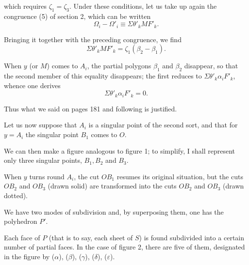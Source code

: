 \documentclass{article}
\begin{document}
which requires $\zeta_{1} = \zeta_{3}$. Under these conditions, let us take up again the congruence (5) of section 2, which can be written
\[ \Omega_{i} - \Omega'_{i} \equiv \Sigma \theta'_{k} MF'_{k}. \]

Bringing it together with the preceding congruence, we find
\[ \Sigma \theta'_{k} MF'_{k} = \zeta_{1}(\beta_{2} - \beta_{1}). \]

When $y$ (or $M$) comes to $A_{i}$, the partial polygons $\beta_{1}$ and $\beta_{2}$ disappear, so that the second member of this equality disappears; the first reduces to $\Sigma \theta'_{k} \alpha_{i}F'_{k}$, whence one derives
\[ \Sigma \theta'_{k} \alpha_{i}F'_{k} = 0. \]

Thus what we said on pages 181 and following is justified.

Let us now suppose that $A_{i}$ is a singular point of the second sort, and that for $y = A_{i}$ the singular point $B_{1}$ comes to $O$.

We can then make a figure analogous to figure 1; to simplify, I shall represent only three singular points, $B_{1}, B_{2}$ and $B_{3}$.

When $y$ turns round $A_{i}$, the cut $OB_{1}$ resumes its original
situation, but the cuts $OB_{2}$ and $OB_{3}$ (drawn solid) are transformed into the cuts $OB_{2}$ and $OB_{3}$ (drawn dotted).


We have two modes of subdivision and, by superposing them, one has the polyhedron $P'$.

Each face of $P$ (that is to say, each sheet of $S$) is found subdivided into a certain number of partial faces. In the case of figure 2, there are five of them, designated in the figure by ($\alpha$), ($\beta$), ($\gamma$), ($\delta$), ($\varepsilon$).
\end{document}
